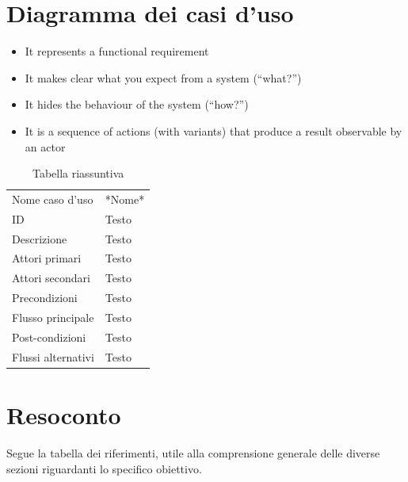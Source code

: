 \documentclass{article}
\begin{document}
\section{Diagramma dei casi d'uso}

\begin{itemize}
    \item It represents a functional requirement
    \item It makes clear what you expect from a system (“what?”)
    \item It hides the behaviour of the system (“how?”)
    \item It is a sequence of actions (with variants) that produce a result observable by an actor
\end{itemize}


\begin{table}[htbp]
    \centering
    \begin{tabularx}{\textwidth}{| l | p{} |}
        \Xhline{2pt} %
        Nome caso d'uso & *Nome* \\
        \Xhline{2pt} %
        ID & Testo \\
        \hline
        Descrizione & Testo \\
        \hline
        Attori primari & Testo \\
        \hline
        Attori secondari & Testo \\
        \hline
        Precondizioni & Testo \\
        \hline
        Flusso principale & Testo \\
        \hline
        Post-condizioni & Testo \\
        \hline
        Flussi alternativi & Testo \\
        \hline
    \end{tabularx}
    \caption{Tabella riassuntiva}
    \label{tab:tabella_use_case}
\end{table}

\clearpage

\section{Resoconto}

Segue la tabella dei riferimenti, utile alla comprensione generale delle diverse sezioni riguardanti lo specifico obiettivo.\\
\end{document}
